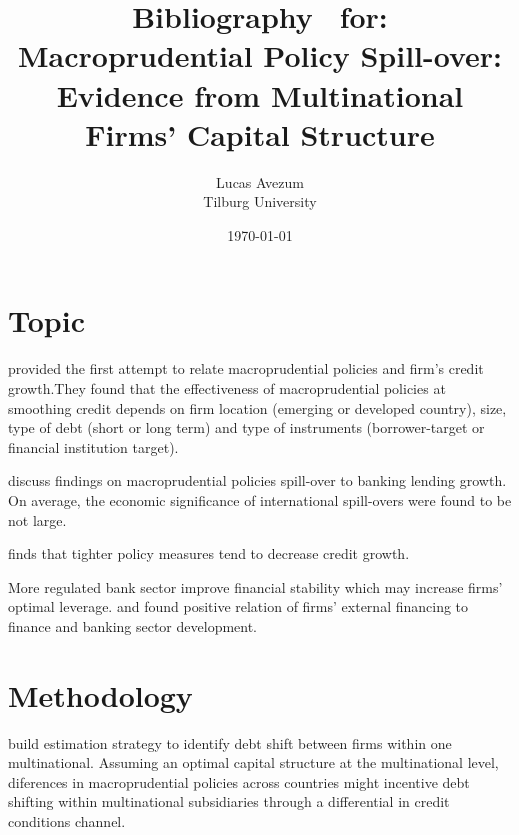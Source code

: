 \documentclass[12pt,runningheads]{article}
\begin{document}
\title{Bibliography \ for:\\ \textbf{
   Macroprudential Policy Spill-over: Evidence from Multinational Firms' Capital Structure \large}} 


\author{Lucas Avezum \\
Tilburg University \vspace*{20pt}}
\date{\today }

\maketitle
\section{Topic}
\cite*{ayyagari2017credit} provided the first attempt to relate macroprudential policies and firm's credit growth.They found that the effectiveness of macroprudential policies at smoothing credit depends on firm location (emerging or developed country), size, type of debt (short or long term) and type of instruments (borrower-target or financial institution target).

\cite*{buch2017international} discuss findings on macroprudential policies spill-over to banking lending growth. On average, the economic significance of international spill-overs were found to be not large.

\cite*{jimenez2012macroprudential} finds that tighter policy measures tend to decrease credit growth.

 More regulated bank sector improve financial stability which may increase firms' optimal leverage. \cite*{beck2004bank} and \cite{demirgucc1998law} found positive relation of firms' external financing to finance and banking sector development.
 
\section{Methodology}
\cite*{huizinga2008capital} build estimation strategy to identify debt shift between firms within one multinational. Assuming an optimal capital structure at the multinational level, diferences in macroprudential policies across countries might incentive debt shifting within multinational subsidiaries through a differential in credit conditions channel.





\end{document}
